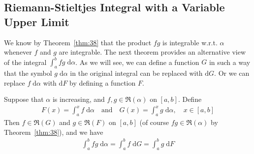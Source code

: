 \documentclass[thmcnt=section, 12pt]{my-elegantbook}
\begin{document}

\subsection{Riemann-Stieltjes Integral with a Variable Upper Limit}

We know by Theorem~\ref{thm:38} that the product $fg$ is integrable w.r.t. $\alpha$ whenever $f$ and $g$ are integrable. The next theorem provides an alternative view of the integral $\int_{a}^{b} f g \; \mathrm{d}\alpha$. As we will see, we can define a function $G$ in such a way that the symbol $g \; \mathrm{d}\alpha$ in the original integral can be replaced with $\mathrm{d}G$. Or we can replace $f \; \mathrm{d}\alpha$ with $\mathrm{d}F$ by defining a function $F$.

\begin{theorem} \label{thm:39}
    Suppose that $\alpha$ is increasing, and $f, g \in \mathfrak{R}(\alpha)$ on $[a, b]$. Define 
    \begin{align*}
        F(x) = \int_{a}^{x} f \; \mathrm{d}\alpha
        \quad\text{and}\quad
        G(x) = \int_{a}^{x} g \; \mathrm{d}\alpha,
        \quad x \in [a, b]
    \end{align*}
    Then $f \in \mathfrak{R}(G)$ and $g \in \mathfrak{R}(F)$ on $[a, b]$ (of course $fg \in \mathfrak{R}(\alpha)$ by Theorem~\ref{thm:38}), and we have 
    \begin{align*}
        \int_{a}^{b} fg \; \mathrm{d}\alpha
        = \int_{a}^{b} f \; \mathrm{d}G
        = \int_{a}^{b} g \; \mathrm{d}F
    \end{align*}
\end{theorem}
\end{document}
